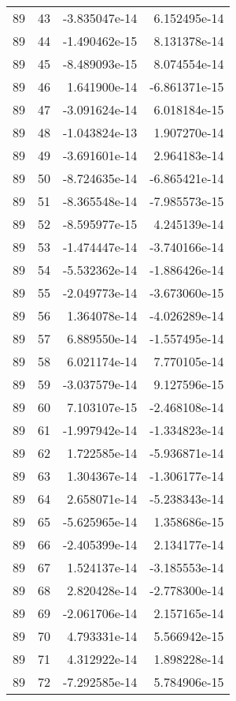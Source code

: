 \begin{tabular}{rrrr}
  89 &   43 & -3.835047e-14 &  6.152495e-14 \\
  89 &   44 & -1.490462e-15 &  8.131378e-14 \\
  89 &   45 & -8.489093e-15 &  8.074554e-14 \\
  89 &   46 &  1.641900e-14 & -6.861371e-15 \\
  89 &   47 & -3.091624e-14 &  6.018184e-15 \\
  89 &   48 & -1.043824e-13 &  1.907270e-14 \\
  89 &   49 & -3.691601e-14 &  2.964183e-14 \\
  89 &   50 & -8.724635e-14 & -6.865421e-14 \\
  89 &   51 & -8.365548e-14 & -7.985573e-15 \\
  89 &   52 & -8.595977e-15 &  4.245139e-14 \\
  89 &   53 & -1.474447e-14 & -3.740166e-14 \\
  89 &   54 & -5.532362e-14 & -1.886426e-14 \\
  89 &   55 & -2.049773e-14 & -3.673060e-15 \\
  89 &   56 &  1.364078e-14 & -4.026289e-14 \\
  89 &   57 &  6.889550e-14 & -1.557495e-14 \\
  89 &   58 &  6.021174e-14 &  7.770105e-14 \\
  89 &   59 & -3.037579e-14 &  9.127596e-15 \\
  89 &   60 &  7.103107e-15 & -2.468108e-14 \\
  89 &   61 & -1.997942e-14 & -1.334823e-14 \\
  89 &   62 &  1.722585e-14 & -5.936871e-14 \\
  89 &   63 &  1.304367e-14 & -1.306177e-14 \\
  89 &   64 &  2.658071e-14 & -5.238343e-14 \\
  89 &   65 & -5.625965e-14 &  1.358686e-15 \\
  89 &   66 & -2.405399e-14 &  2.134177e-14 \\
  89 &   67 &  1.524137e-14 & -3.185553e-14 \\
  89 &   68 &  2.820428e-14 & -2.778300e-14 \\
  89 &   69 & -2.061706e-14 &  2.157165e-14 \\
  89 &   70 &  4.793331e-14 &  5.566942e-15 \\
  89 &   71 &  4.312922e-14 &  1.898228e-14 \\
  89 &   72 & -7.292585e-14 &  5.784906e-15 \\

\end{tabular}
